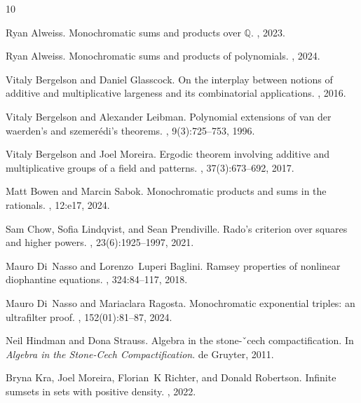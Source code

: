\documentclass[10pt,a4paper]{article}
\theoremstyle{definition}
\begin{document}
\begin{thebibliography}{10}

Ryan Alweiss.
\newblock Monochromatic sums and products over $\mathbb{Q}$.
, 2023.

Ryan Alweiss.
\newblock Monochromatic sums and products of polynomials.
, 2024.

Vitaly Bergelson and Daniel Glasscock.
\newblock On the interplay between notions of additive and multiplicative
  largeness and its combinatorial applications.
, 2016.

Vitaly Bergelson and Alexander Leibman.
\newblock Polynomial extensions of van der waerden’s and szemer{\'e}di’s
  theorems.
, 9(3):725--753,
  1996.

Vitaly Bergelson and Joel Moreira.
\newblock Ergodic theorem involving additive and multiplicative groups of a
  field and patterns.
, 37(3):673--692, 2017.

Matt Bowen and Marcin Sabok.
\newblock Monochromatic products and sums in the rationals.
, 12:e17, 2024.

Sam Chow, Sofia Lindqvist, and Sean Prendiville.
\newblock Rado's criterion over squares and higher powers.
, 23(6):1925--1997,
  2021.

Mauro Di~Nasso and Lorenzo~Luperi Baglini.
\newblock Ramsey properties of nonlinear diophantine equations.
, 324:84--117, 2018.

Mauro Di~Nasso and Mariaclara Ragosta.
\newblock Monochromatic exponential triples: an ultrafilter proof.
,
  152(01):81--87, 2024.

Neil Hindman and Dona Strauss.
\newblock Algebra in the stone-ˇcech compactification.
\newblock In {\em Algebra in the Stone-Cech Compactification}. de Gruyter,
  2011.

Bryna Kra, Joel Moreira, Florian~K Richter, and Donald Robertson.
\newblock Infinite sumsets in sets with positive density.
, 2022.


\end{thebibliography}
\end{document}
